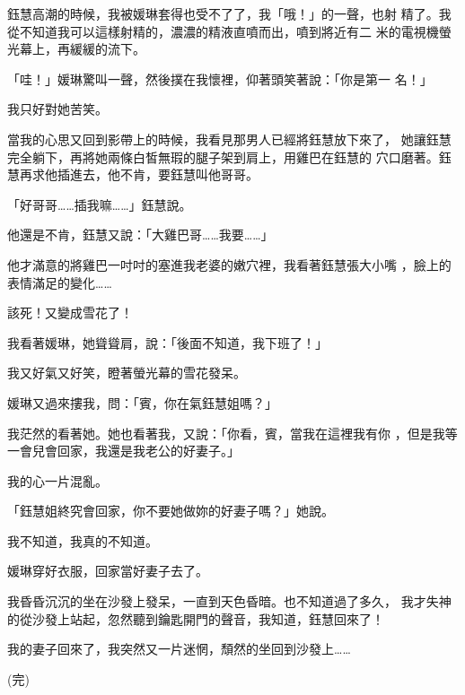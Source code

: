 鈺慧高潮的時候，我被媛琳套得也受不了了，我「哦！」的一聲，也射
精了。我從不知道我可以這樣射精的，濃濃的精液直噴而出，噴到將近有二
米的電視機螢光幕上，再緩緩的流下。

「哇！」媛琳驚叫一聲，然後撲在我懷裡，仰著頭笑著說：「你是第一
名！」

我只好對她苦笑。

當我的心思又回到影帶上的時候，我看見那男人已經將鈺慧放下來了，
她讓鈺慧完全躺下，再將她兩條白皙無瑕的腿子架到肩上，用雞巴在鈺慧的
穴口磨著。鈺慧再求他插進去，他不肯，要鈺慧叫他哥哥。

「好哥哥……插我嘛……」鈺慧說。

他還是不肯，鈺慧又說：「大雞巴哥……我要……」

他才滿意的將雞巴一吋吋的塞進我老婆的嫩穴裡，我看著鈺慧張大小嘴
，臉上的表情滿足的變化……

該死！又變成雪花了！

我看著媛琳，她聳聳肩，說：「後面不知道，我下班了！」

我又好氣又好笑，瞪著螢光幕的雪花發呆。

媛琳又過來摟我，問：「賓，你在氣鈺慧姐嗎？」

我茫然的看著她。她也看著我，又說：「你看，賓，當我在這裡我有你
，但是我等一會兒會回家，我還是我老公的好妻子。」

我的心一片混亂。

「鈺慧姐終究會回家，你不要她做妳的好妻子嗎？」她說。

我不知道，我真的不知道。

媛琳穿好衣服，回家當好妻子去了。

我昏昏沉沉的坐在沙發上發呆，一直到天色昏暗。也不知道過了多久，
我才失神的從沙發上站起，忽然聽到鑰匙開門的聲音，我知道，鈺慧回來了！

我的妻子回來了，我突然又一片迷惘，頹然的坐回到沙發上……

(完)
